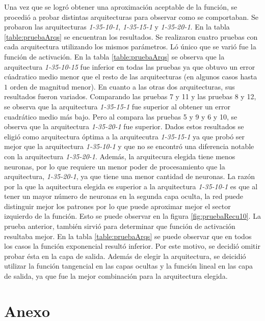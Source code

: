 \documentclass[11pt,a4paper]{article}
\begin{document}
Una vez que se logró obtener una aproximación aceptable de la función, se procedió a probar distintas arquitecturas para observar como se comportaban. Se probaron las arquitecturas \emph{1-35-10-1}, \emph{1-35-15-1} y \emph{1-35-20-1}. En la tabla \ref{table:pruebaArqs} se encuentran los resultados. Se realizaron cuatro pruebas con cada arquitectura utilizando los mismos parámetros. Ló único que se varió fue la función de activación. En la tabla \ref{table:pruebaArqs} se observa que la arquitectura \emph{1-35-10-15} fue inferior en todas las pruebas ya que obtuvo un error cúadratico medio menor que el resto de las arquitecturas (en algunos casos hasta $1$ orden de magnitud menor). En cuanto a las otras dos arquitecturas, sus resultados fueron variados. Comparando las pruebas 7 y 11 y las pruebas 8 y 12, se observa que la arquitectura \emph{1-35-15-1} fue superior al obtener un error cuadrático medio más bajo. Pero al compara las pruebas 5 y 9 y 6 y 10, se observa que la arquitectura \emph{1-35-20-1} fue superior. Dados estos resultados se eligió como arquitectura óptima a la arquitecutra \emph{1-35-15-1} ya que probó ser mejor que la arquitectura \emph{1-35-10-1} y que no se encontró una diferencia notable con la arquitectura \emph{1-35-20-1}. Además, la arquitecura elegida tiene menos neuronas, por lo que requiere un menor poder de procesamiento que la arquitectura, \emph{1-35-20-1}, ya que tiene una menor cantidad de neuronas. La razón por la que la aquitectura elegida es superior a la arquitectura \emph{1-35-10-1} es que al tener un mayor número de neuronas en la segunda capa oculta, la red puede distinguir mejor los patrones por lo que puede aproximar mejor el sector izquierdo de la función. Esto se puede observar en la figura \ref{fig:pruebaRecu10}. La prueba anterior, también sirvió para determinar que función de activación resultaba mejor. En la tabla \ref{table:pruebaArqs} se puede observar que en todos los casos la función exponencial resultó inferior. Por este motivo, se decidió omitir probar ésta en la capa de salida. Además de elegir la arquitectura, se deicidió utilizar la función tangencial en las capas ocultas y la función lineal en las capa de salida, ya que fue la mejor combinación para la arquitectura elegida.

   

\clearpage	
\appendix
\renewcommand{\figurename}{Figura}
\section{Anexo}
\end{document}
